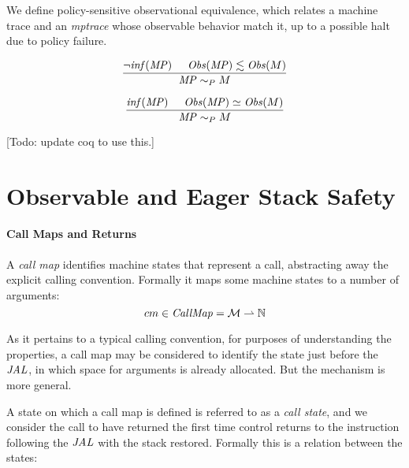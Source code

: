 \documentclass[conference]{IEEEtran}
\begin{document}

    We define policy-sensitive observational equivalence, which relates a machine trace and
    an {\it mptrace} whose observable behavior match it, up to a possible halt due to policy failure.

    \[\frac{\neg \mathit{inf}(\mathit{MP}) \hspace{.5cm} \mathit{Obs}(\mathit{MP}) \lesssim \mathit{Obs}(M)}
           {\mathit{MP} \sim_P M}\]
    
    \[\frac{\mathit{inf}(\mathit{MP}) \hspace{.5cm} \mathit{Obs}(\mathit{MP}) \simeq \mathit{Obs}(M)}
           {\mathit{MP} \sim_P M}\]

    [Todo: update coq to use this.]

    
  \section{Observable and Eager Stack Safety}

    \paragraph*{Call Maps and Returns}

    A {\it call map} identifies machine states that represent a call, abstracting away the explicit
    calling convention. Formally it maps some machine states to a number of arguments:
    \[cm \in \mathit{CallMap} = {\mathcal M} \rightharpoonup \mathbb{N}\]

    As it pertains to a typical calling convention, for purposes of understanding the properties,
    a call map may be considered to identify the state just before the \(\mathit{JAL}\), in which space for
    arguments is already allocated. But the mechanism is more general.

    A state on which a call map is defined is referred to as a {\it call state}, and we consider
    the call to have returned the first time control returns to the instruction following the
    \(\mathit{JAL}\) with the stack restored. Formally this is a relation between the states:
    
\end{document}

